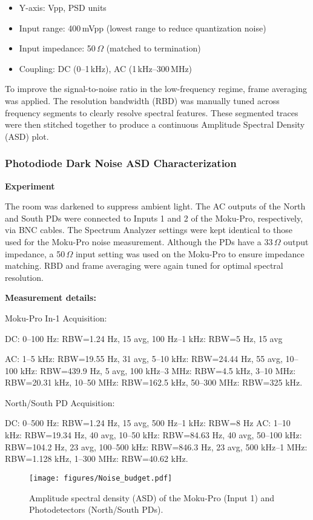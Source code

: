 \documentclass[colorlinks=true,pdfstartview=FitV,linkcolor=blue,
citecolor=red,urlcolor=magenta]{ligodoc}
\begin{document}
\begin{itemize}
    \item Y-axis: Vpp, PSD units
    \item Input range: 400\,mVpp (lowest range to reduce quantization noise)
    \item Input impedance: 50\,$\Omega$ (matched to termination)
    \item Coupling: DC (0–1\,kHz), AC (1\,kHz–300\,MHz)
\end{itemize}

To improve the signal-to-noise ratio in the low-frequency regime, frame averaging was applied. The resolution bandwidth (RBD) was manually tuned across frequency segments to clearly resolve spectral features. These segmented traces were then stitched together to produce a continuous Amplitude Spectral Density (ASD) plot.

\subsubsection{ Photodiode Dark Noise  ASD Characterization}
\textbf{Experiment}

The room was darkened to suppress ambient light. The AC outputs of the North and South PDs were connected to Inputs 1 and 2 of the Moku-Pro, respectively, via BNC cables. The Spectrum Analyzer settings were kept identical to those used for the Moku-Pro noise measurement. Although the PDs have a 33\,$\Omega$ output impedance, a 50\,$\Omega$ input setting was used on the Moku-Pro to ensure impedance matching. RBD and frame averaging were again tuned for optimal spectral resolution.

\textbf{Measurement details:}

Moku-Pro In-1 Acquisition:

    DC: 0–100 Hz: RBW=1.24 Hz, 15 avg,
    100 Hz–1 kHz: RBW=5 Hz, 15 avg 

     AC: 
    1–5 kHz: RBW=19.55 Hz, 31 avg, 
    5–10 kHz: RBW=24.44 Hz, 55 avg,
    10–100 kHz: RBW=439.9 Hz, 5 avg,
    100 kHz–3 MHz: RBW=4.5 kHz,
    3–10 MHz: RBW=20.31 kHz,
    10–50 MHz: RBW=162.5 kHz, 
    50–300 MHz: RBW=325 kHz.

North/South PD Acquisition:

    DC: 0–500 Hz: RBW=1.24 Hz, 15 avg,  
    500 Hz–1 kHz: RBW=8 Hz
     AC: 1–10 kHz: RBW=19.34 Hz, 40 avg, 
    10–50 kHz: RBW=84.63 Hz, 40 avg, 
    50–100 kHz: RBW=104.2 Hz, 23 avg, 
    100–500 kHz: RBW=846.3 Hz, 23 avg, 
    500 kHz–1 MHz: RBW=1.128 kHz, 
    1–300 MHz: RBW=40.62 kHz.
\begin{figure}[H]
    \centering
    \texttt{[image: figures/Noise\_budget.pdf]}
    \caption{
    Amplitude spectral density (ASD) of the Moku-Pro (Input 1) and Photodetectors (North/South PDs). }
     \label{fig:asd_moku_pd}
\end{figure}
 
\end{document}
